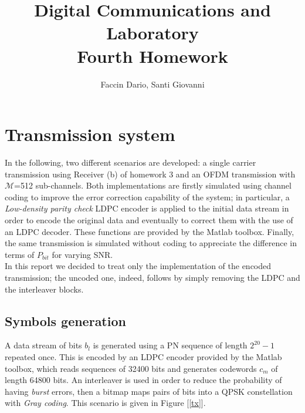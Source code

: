 \documentclass[a4paper, 12pt]{report}
\begin{document}
	
\title{Digital Communications and Laboratory \\ Fourth Homework}
\author{Faccin Dario, Santi Giovanni}
\date{}
\maketitle

\section*{Transmission system}
In the following, two different scenarios are developed: a single carrier transmission using Receiver (b) of homework 3 and an OFDM transmission with $\mathcal{M}$=512 sub-channels. Both implementations are firstly simulated using channel coding to improve the error correction capability of the system; in particular, a \textit{Low-density parity check} LDPC encoder is applied to the initial data stream in order to encode the original data and eventually to correct them with the use of an LDPC decoder. These functions are provided by the Matlab toolbox. Finally, the same transmission is simulated without coding to appreciate the difference in terms of $P_{bit}$ for varying SNR. \\
In this report we decided to treat only the implementation of the encoded transmission; the uncoded one, indeed, follows by simply removing the LDPC and the interleaver blocks.

\subsection*{Symbols generation}
A data stream of bits $b_l$ is generated using a PN sequence of length $2^{20}-1$ repeated once. This is encoded by an LDPC encoder provided by the Matlab toolbox, which reads sequences of 32400 bits and generates codewords $c_m$ of length 64800 bits. An interleaver is used in order to reduce the probability of having \textit{burst} errors, then a bitmap maps pairs of bits into a QPSK constellation with \textit{Gray coding}. This scenario is given in Figure [\ref{tx}].
\end{document}
